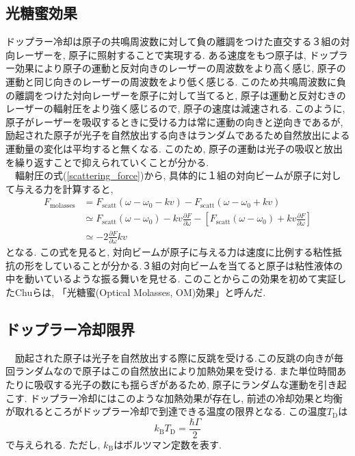 \documentclass[uplatex, dvipdfmx, a4paper, report, papersize, 11pt]{jsbook}
\begin{document}
\subsection{光糖蜜効果}
ドップラー冷却は原子の共鳴周波数に対して負の離調をつけた直交する３組の対向レーザーを, 原子に照射することで実現する. ある速度をもつ原子は, ドップラー効果により原子の運動と反対向きのレーザーの周波数をより高く感じ, 原子の運動と同じ向きのレーザーの周波数をより低く感じる. このため共鳴周波数に負の離調をつけた対向レーザーを原子に対して当てると, 原子は運動と反対むきのレーザーの輻射圧をより強く感じるので, 原子の速度は減速される. このように, 原子がレーザーを吸収するときに受ける力は常に運動の向きと逆向きであるが, 励起された原子が光子を自然放出する向きはランダムであるため自然放出による運動量の変化は平均すると無くなる. このため, 原子の運動は光子の吸収と放出を繰り返すことで抑えられていくことが分かる.\\
　輻射圧の式(\ref{scattering_force})から, 具体的に１組の対向ビームが原子に対して与える力を計算すると,
\begin{equation}
  \begin{split}
    F _ { \mathrm{molasses} } &= F _ { \mathrm{scatt}  } \left( \omega - \omega _ { 0 } - k v \right) - F _ {  \mathrm{scatt} }  \left( \omega - \omega _ { 0 } + k v \right)
    \\& \simeq F _ { \mathrm{scatt}  } \left( \omega - \omega _ { 0 } \right) - k v \frac { \partial F } { \partial \omega } - \left[ F _ {  \mathrm{scatt} } \left( \omega - \omega _ { 0 } \right) + k v \frac { \partial F } { \partial \omega } \right]
    \\& \simeq - 2 \frac { \partial F } { \partial \omega } k v
  \end{split}
\end{equation}
となる. この式を見ると, 対向ビームが原子に与える力は速度に比例する粘性抵抗の形をしていることが分かる.３組の対向ビームを当てると原子は粘性液体の中を動いているような振る舞いを見せる. このことからこの効果を初めて実証したChuらは, 「光糖蜜(Optical Molasses,  OM)効果」と呼んだ.

\subsection{ドップラー冷却限界}
　励起された原子は光子を自然放出する際に反跳を受ける.この反跳の向きが毎回ランダムなので原子はこの自然放出により加熱効果を受ける. また単位時間あたりに吸収する光子の数にも揺らぎがあるため, 原子にランダムな運動を引き起こす.
ドップラー冷却にはこのような加熱効果が存在し, 前述の冷却効果と均衡が取れるところがドップラー冷却で到達できる温度の限界となる. この温度$T _ { \mathrm { D } }$は
\begin{equation}
  k _ { \mathrm { B } } T _ { \mathrm { D } } = \frac { \hbar \Gamma } { 2 }
\end{equation}
で与えられる. ただし, $k _ { \mathrm { B } }$はボルツマン定数を表す.
\end{document}
